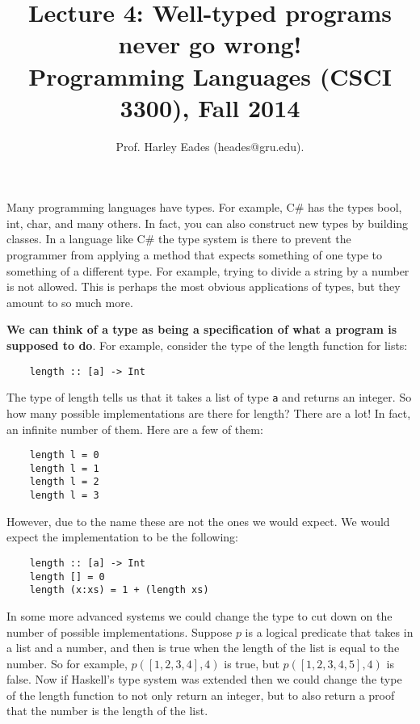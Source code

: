 \documentclass{article}
\title{Lecture 4: Well-typed programs never go wrong!\\Programming Languages (CSCI 3300), Fall 2014\vspace{-22px}}
\author{Prof. Harley Eades (heades@gru.edu).}
\date{\vspace{-22px}}
\begin{document}
\maketitle  

Many programming languages have types.  For example, C\# has the types
bool, int, char, and many others.  In fact, you can also construct new
types by building classes.  In a language like C\# the type system is
there to prevent the programmer from applying a method that expects
something of one type to something of a different type.  For example,
trying to divide a string by a number is not allowed.  This is perhaps
the most obvious applications of types, but they amount to so much
more.  

\textbf{We can think of a type as being a specification of what a
  program is supposed to do}.  For example, consider the type of the
length function for lists:
\begin{center}
  \begin{verbatim}
    length :: [a] -> Int
  \end{verbatim}
\end{center}
The type of length tells us that it takes a list of type \verb=a= and
returns an integer.  So how many possible implementations are there
for length?  There are a lot!  In fact, an infinite number of them.
Here are a few of them:
\begin{center}
  \begin{verbatim}
    length l = 0
    length l = 1
    length l = 2
    length l = 3   
  \end{verbatim}
\end{center}
However, due to the name these are not the ones we would expect.  We
would expect the implementation to be the following:
\begin{center}
  \begin{verbatim}
    length :: [a] -> Int
    length [] = 0
    length (x:xs) = 1 + (length xs)
  \end{verbatim}
\end{center}
In some more advanced systems we could change the type to cut down on
the number of possible implementations.  Suppose $p$ is a logical
predicate that takes in a list and a number, and then is true when the
length of the list is equal to the number.  So for example,
$p([1,2,3,4], 4)$ is true, but $p([1,2,3,4,5], 4)$ is false.  Now if
Haskell's type system was extended then we could change the type of
the length function to not only return an integer, but to also
return a proof that the number is the length of the list. 
\end{document}
